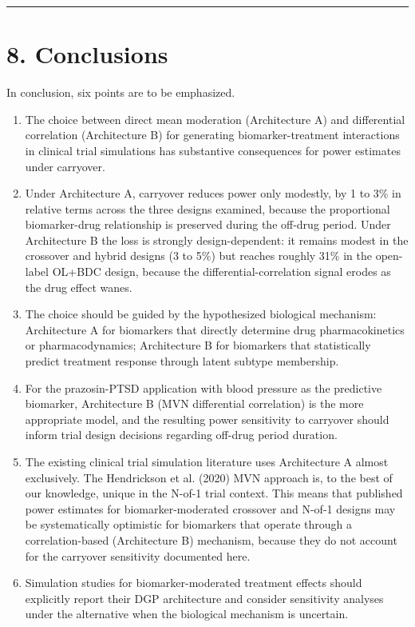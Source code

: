 \documentclass[
  11pt,
]{article}
\begin{document}
\bigskip\noindent

\rule{\textwidth}{0.4pt}\bigskip

\section{8. Conclusions}

In conclusion, six points are to be emphasized.

\begin{enumerate}
\item The choice between direct mean moderation (Architecture A) and
  differential correlation (Architecture B) for generating
  biomarker-treatment interactions in clinical trial simulations
  has substantive consequences for power estimates under
  carryover.

\item Under Architecture A, carryover reduces power only
  modestly, by 1 to 3\% in relative terms across the three
  designs examined, because the proportional biomarker-drug
  relationship is preserved during the off-drug period. Under
  Architecture B the loss is strongly design-dependent: it
  remains modest in the crossover and hybrid designs (3 to
  5\%) but reaches roughly 31\% in the open-label OL+BDC
  design, because the differential-correlation signal erodes
  as the drug effect wanes.

\item The choice should be guided by the hypothesized biological
  mechanism: Architecture A for biomarkers that directly
  determine drug pharmacokinetics or pharmacodynamics;
  Architecture B for biomarkers that statistically predict
  treatment response through latent subtype membership.

\item For the prazosin-PTSD application with blood pressure as the
  predictive biomarker, Architecture B (MVN differential
  correlation) is the more appropriate model, and the resulting
  power sensitivity to carryover should inform trial design
  decisions regarding off-drug period duration.

\item The existing clinical trial simulation literature uses
  Architecture A almost exclusively. The Hendrickson et al.
  (2020) MVN approach is, to the best of our knowledge, unique
  in the N-of-1 trial context. This means that published power
  estimates for biomarker-moderated crossover and N-of-1
  designs may be systematically optimistic for biomarkers
  that operate through a correlation-based (Architecture B)
  mechanism, because they do not account for the carryover
  sensitivity documented here.

\item Simulation studies for biomarker-moderated treatment effects
  should explicitly report their DGP architecture and consider
  sensitivity analyses under the alternative when the biological
  mechanism is uncertain.
\end{enumerate}
\end{document}
